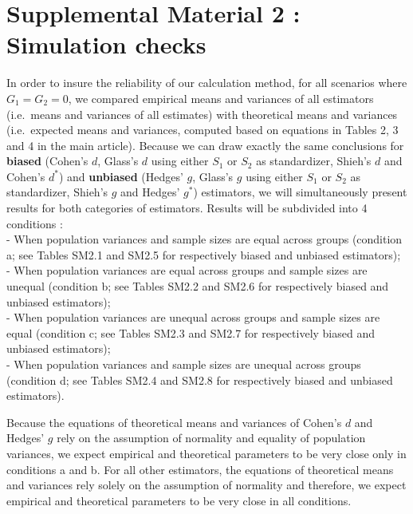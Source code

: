 \documentclass[
  english,
  man,mask,floatsintext]{apa6}
\begin{document}
\newpage

\hypertarget{supplemental-material-2-simulation-checks}{%
\section{Supplemental Material 2 : Simulation checks}\label{supplemental-material-2-simulation-checks}}

In order to insure the reliability of our calculation method, for all scenarios where \(G_1=G_2=0\), we compared empirical means and variances of all estimators (i.e.~means and variances of all estimates) with theoretical means and variances (i.e.~expected means and variances, computed based on equations in Tables 2, 3 and 4 in the main article). Because we can draw exactly the same conclusions for \textbf{biased} (Cohen's \(d\), Glass's \(d\) using either \(S_1\) or \(S_2\) as standardizer, Shieh's \(d\) and Cohen's \(d^*\)) and \textbf{unbiased} (Hedges' \(g\), Glass's \(g\) using either \(S_1\) or \(S_2\) as standardizer, Shieh's \(g\) and Hedges' \(g^*\)) estimators, we will simultaneously present results for both categories of estimators. Results will be subdivided into 4 conditions :\\
- When population variances and sample sizes are equal across groups (condition a; see Tables SM2.1 and SM2.5 for respectively biased and unbiased estimators);\\
- When population variances are equal across groups and sample sizes are unequal (condition b; see Tables SM2.2 and SM2.6 for respectively biased and unbiased estimators);\\
- When population variances are unequal across groups and sample sizes are equal (condition c; see Tables SM2.3 and SM2.7 for respectively biased and unbiased estimators);\\
- When population variances and sample sizes are unequal across groups (condition d; see Tables SM2.4 and SM2.8 for respectively biased and unbiased estimators).

Because the equations of theoretical means and variances of Cohen's \(d\) and Hedges' \(g\) rely on the assumption of normality and equality of population variances, we expect empirical and theoretical parameters to be very close only in conditions a and b. For all other estimators, the equations of theoretical means and variances rely solely on the assumption of normality and therefore, we expect empirical and theoretical parameters to be very close in all conditions.
\end{document}
